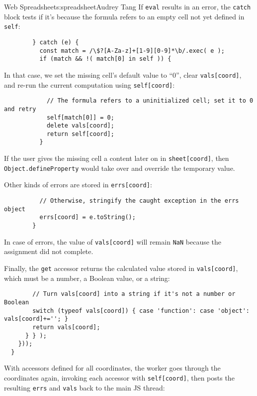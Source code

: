 \begin{aosachapter}{Web Spreadsheet}{s:spreadsheet}{Audrey Tang}
If \texttt{eval} results in an error, the \texttt{catch} block tests if
it's because the formula refers to an empty cell not yet defined in
\texttt{self}:

\begin{verbatim}
        } catch (e) {
          const match = /\$?[A-Za-z]+[1-9][0-9]*\b/.exec( e );
          if (match && !( match[0] in self )) {
\end{verbatim}

In that case, we set the missing cell's default value to ``0'', clear
\texttt{vals{[}coord{]}}, and re-run the current computation using
\texttt{self{[}coord{]}}:

\begin{verbatim}
            // The formula refers to a uninitialized cell; set it to 0 and retry
            self[match[0]] = 0;
            delete vals[coord];
            return self[coord];
          }
\end{verbatim}

If the user gives the missing cell a content later on in
\texttt{sheet{[}coord{]}}, then \texttt{Object.defineProperty} would
take over and override the temporary value.

Other kinds of errors are stored in \texttt{errs{[}coord{]}}:

\begin{verbatim}
          // Otherwise, stringify the caught exception in the errs object
          errs[coord] = e.toString();
        }
\end{verbatim}

In case of errors, the value of \texttt{vals{[}coord{]}} will remain
\texttt{NaN} because the assignment did not complete.

Finally, the \texttt{get} accessor returns the calculated value stored
in \texttt{vals{[}coord{]}}, which must be a number, a Boolean value, or
a string:

\begin{verbatim}
        // Turn vals[coord] into a string if it's not a number or Boolean
        switch (typeof vals[coord]) { case 'function': case 'object': vals[coord]+=''; }
        return vals[coord];
      } } );
    }));
  }
\end{verbatim}

With accessors defined for all coordinates, the worker goes through the
coordinates again, invoking each accessor with \texttt{self{[}coord{]}},
then posts the resulting \texttt{errs} and \texttt{vals} back to the
main JS thread:


\end{aosachapter}
